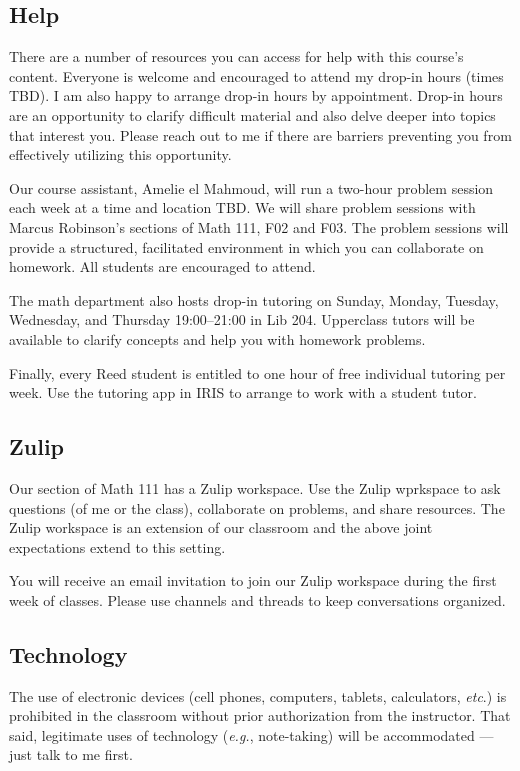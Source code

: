 \documentclass[11pt,twoside]{amsart}
\begin{document}
\subsection*{Help}
There are a number of resources you can access for help with this course's content.  Everyone is welcome and encouraged to attend my drop-in hours (times TBD).  I am also happy to arrange drop-in hours by appointment.  Drop-in hours are an opportunity to clarify difficult material and also delve deeper into topics that interest you.  Please reach out to me if there are barriers preventing you from effectively utilizing this opportunity.

Our course assistant, Amelie el Mahmoud, will run a two-hour problem session each week at a time and location TBD.  We will share problem sessions with Marcus Robinson's sections of Math 111, F02 and F03.  The problem sessions will provide a structured, facilitated environment in which you can collaborate on homework.  All students are encouraged to attend.

The math department also hosts drop-in tutoring on Sunday, Monday, Tuesday, Wednesday, and Thursday 19:00--21:00 in Lib 204. Upperclass tutors will be available to clarify concepts and help you with homework problems.

Finally, every Reed student is entitled to one hour of free individual tutoring per week.  Use the tutoring app in IRIS to arrange to work with a student tutor.

\subsection*{Zulip}
Our section of Math 111 has a Zulip workspace.  Use the Zulip wprkspace to ask questions (of me or the class), collaborate on problems, and share resources. The Zulip workspace is an extension of our classroom and the above joint expectations extend to this setting.

You will receive an email invitation to join our Zulip workspace during the first week of classes. Please use channels and threads to keep conversations organized.

\subsection*{Technology}
The use of electronic devices (cell phones, computers, tablets, 
calculators, \emph{etc}.) is prohibited in the classroom without prior 
authorization from the instructor.  That said, legitimate uses 
of technology (\emph{e.g.}, note-taking) will be accommodated --- 
just talk to me first.
\end{document}
